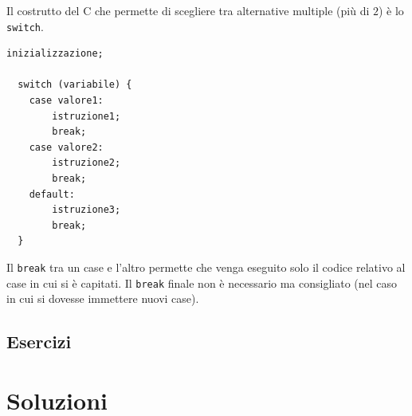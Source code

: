 \documentclass[oneside]{scrbook}
\begin{document}
Il costrutto del C che permette di scegliere tra alternative multiple (pi\`u di $2$) \`e lo \texttt{switch}.

\begin{lstlisting}[style=cstyle]
  inizializzazione;

  switch (variabile) {
    case valore1:
    	istruzione1;
    	break;
    case valore2:
    	istruzione2;
    	break;
    default:
    	istruzione3;
    	break;
  }
\end{lstlisting}

Il \texttt{break} tra un case e l'altro permette che venga eseguito solo il codice relativo al case in cui si \`e capitati. Il \texttt{break} finale non \`e necessario ma consigliato (nel caso in cui si dovesse immettere nuovi case).

\subsection{Esercizi}












% 












\clearpage
\section*{Soluzioni}
\shipoutAnswer
\end{document}

